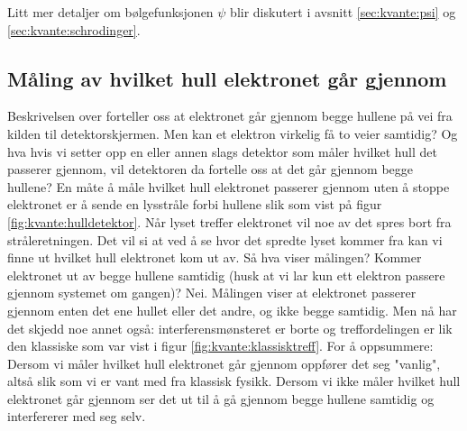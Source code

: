 Litt mer detaljer om bølgefunksjonen $\psi$ blir diskutert i avsnitt \ref{sec:kvante:psi} og \ref{sec:kvante:schrodinger}.

\subsection{Måling av hvilket hull elektronet går gjennom}
Beskrivelsen over forteller oss at elektronet går gjennom begge hullene på vei fra kilden til detektorskjermen. Men kan et elektron virkelig få to veier samtidig? Og hva hvis vi setter opp en eller annen slags detektor som måler hvilket hull det passerer gjennom, vil detektoren da fortelle oss at det går gjennom begge hullene? En måte å måle hvilket hull elektronet passerer gjennom uten å stoppe elektronet er å sende en lysstråle forbi hullene slik som vist på figur \ref{fig:kvante:hulldetektor}. Når lyset treffer elektronet vil noe av det spres bort fra stråleretningen. Det vil si at ved å se hvor det spredte lyset kommer fra kan vi finne ut hvilket hull elektronet kom ut av. Så hva viser målingen? Kommer elektronet ut av begge hullene samtidig (husk at vi lar kun ett elektron passere gjennom systemet om gangen)? Nei. Målingen viser at elektronet passerer gjennom enten det ene hullet eller det andre, og ikke begge samtidig. Men nå har det skjedd noe annet også: interferensmønsteret er borte og treffordelingen er lik den klassiske som var vist i figur \ref{fig:kvante:klassisktreff}. For å oppsummere: Dersom vi måler hvilket hull elektronet går gjennom oppfører det seg "vanlig", altså slik som vi er vant med fra klassisk fysikk. Dersom vi ikke måler hvilket hull elektronet går gjennom ser det ut til å gå gjennom begge hullene samtidig og interfererer med seg selv.

